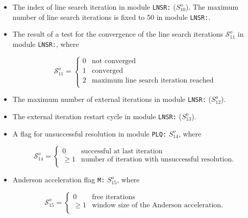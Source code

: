 \begin{itemize}
\begin{displaymath}
\mathcal{S}^{o}_{9} = \left\{
\begin{array}{rl}
 1 & \textrm{SIMPLEX/LEMKE} \\
 2 & \textrm{LEMKE/LEMKE} \\
 3 & \textrm{MAP} \\
 4 & \textrm{Augmented Lagragian} \\
 5 & \textrm{Penalty Method} \\
\end{array} \right.
\end{displaymath}

\item The index of line search iteration in module {\tt LNSR:} (${S}^{o}_{10}$). The maximum number of line search iterations is fixed to 50 in module {\tt LNSR:}.

\item The result of a test for the convergence of the line search iterations $\mathcal{S}^{o}_{11}$ in module {\tt LNSR:}, where

\begin{displaymath}
\mathcal{S}^{o}_{11} = \left\{
\begin{array}{rl}
 0 & \textrm{not converged} \\
 1 & \textrm{converged} \\
 2 & \textrm{maximum line search iteration reached} \\
\end{array} \right.
\end{displaymath}

\item The maximum number of external iterations in module {\tt LNSR:} (${S}^{o}_{12}$).

\item The external iteration restart cycle in module {\tt LNSR:} (${S}^{o}_{13}$).

\item A flag for unsuccessful resolution in module {\tt PLQ:} ${S}^{o}_{14}$, where

\begin{displaymath}
\mathcal{S}^{o}_{14} = \left\{
\begin{array}{rl}
 0 & \textrm{successful at last iteration} \\
 \ge 1 & \textrm{number of iteration with unsuccessful resolution.} \\
\end{array} \right.
\end{displaymath}

\item Anderson acceleration flag {\tt M:} ${S}^{o}_{15}$, where

\begin{displaymath}
\mathcal{S}^{o}_{15} = \left\{
\begin{array}{rl}
 0 & \textrm{free iterations} \\
 \ge 1 & \textrm{window size of the Anderson acceleration.} \\
\end{array} \right.
\end{displaymath}

\end{itemize}

